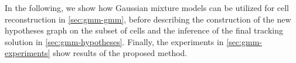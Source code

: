 In the following, we show how Gaussian mixture models can be utilized for cell reconstruction in
\cref{sec:gmm-gmm}, before describing the construction of the new hypotheses graph on the subset
of cells and the inference of the final tracking solution in \cref{sec:gmm-hypotheses}. Finally,
the experiments in \cref{sec:gmm-experiments} show results of the proposed method.







